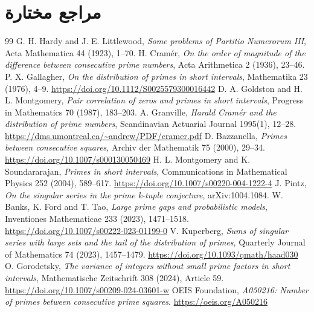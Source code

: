 \documentclass[12pt]{article}
\begin{document}
\section{مراجع مختارة}
\begin{thebibliography}{99}
 G. H. Hardy and J. E. Littlewood, \emph{Some problems of Partitio Numerorum III}, Acta Mathematica 44 (1923), 1--70.
 H. Cram\'er, \emph{On the order of magnitude of the difference between consecutive prime numbers}, Acta Arithmetica 2 (1936), 23--46.
 P. X. Gallagher, \emph{On the distribution of primes in short intervals}, Mathematika 23 (1976), 4--9. \url{https://doi.org/10.1112/S0025579300016442}
 D. A. Goldston and H. L. Montgomery, \emph{Pair correlation of zeros and primes in short intervals}, Progress in Mathematics 70 (1987), 183--203.
 A. Granville, \emph{Harald Cram\'er and the distribution of prime numbers}, Scandinavian Actuarial Journal 1995(1), 12--28. \url{https://dms.umontreal.ca/~andrew/PDF/cramer.pdf}
 D. Bazzanella, \emph{Primes between consecutive squares}, Archiv der Mathematik 75 (2000), 29--34. \url{https://doi.org/10.1007/s000130050469}
 H. L. Montgomery and K. Soundararajan, \emph{Primes in short intervals}, Communications in Mathematical Physics 252 (2004), 589--617. \url{https://doi.org/10.1007/s00220-004-1222-4}
 J. Pintz, \emph{On the singular series in the prime k-tuple conjecture}, arXiv:1004.1084.
 W. Banks, K. Ford and T. Tao, \emph{Large prime gaps and probabilistic models}, Inventiones Mathematicae 233 (2023), 1471--1518. \url{https://doi.org/10.1007/s00222-023-01199-0}
 V. Kuperberg, \emph{Sums of singular series with large sets and the tail of the distribution of primes}, Quarterly Journal of Mathematics 74 (2023), 1457--1479. \url{https://doi.org/10.1093/qmath/haad030}
 O. Gorodetsky, \emph{The variance of integers without small prime factors in short intervals}, Mathematische Zeitschrift 308 (2024), Article 59. \url{https://doi.org/10.1007/s00209-024-03601-w}
 OEIS Foundation, \emph{A050216: Number of primes between consecutive prime squares}. \url{https://oeis.org/A050216}
\end{thebibliography}
\end{document}
